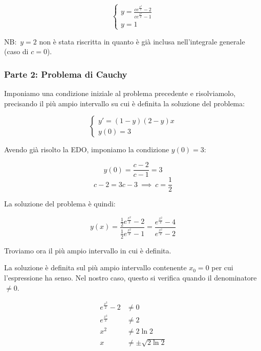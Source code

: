 \begin{equation*}
    \begin{cases}
        y = \frac{ce^{\frac{x ^{2}}{2} }-2}{ce^{\frac{x ^{2}}{2} }-1} \\
        y = 1
    \end{cases}
\end{equation*}

NB:\  \(y=2\) non è stata riscritta in quanto è già inclusa nell'integrale generale (caso di \(c = 0\)).

\filbreak{}
\subsubsection*{Parte 2: Problema di Cauchy}

Imponiamo una condizione iniziale al problema precedente e risolviamolo, precisando il più ampio intervallo su cui è definita la soluzione del problema:

\begin{equation*}
    \begin{cases}
        y'=(1-y)(2-y)x \\
        y(0)=3
    \end{cases}
\end{equation*}

Avendo già risolto la EDO, imponiamo la condizione \(y(0) = 3\):

\[
    y(0) = \frac{c-2}{c-1} = 3
\]
\[
    c-2 = 3c -3 \ \implies \ c = \frac{1}{2}
\]


La soluzione del problema è quindi:

\[
    y(x) = \frac{\frac{1}{2} e ^{\frac{x ^{2}}{2} }-2}{\frac{1}{2} e ^{\frac{x ^{2}}{2} }-1} = \frac{ e ^{\frac{x ^{2}}{2} }-4}{ e ^{\frac{x ^{2}}{2} }-2}
\]

Troviamo ora il più ampio intervallo in cui è definita.

La soluzione è definita sul più ampio intervallo contenente \(x_0 = 0\) per cui l'espressione ha senso. Nel nostro caso, questo si verifica quando il denominatore \(\neq 0\).

\begin{align*}
    e ^{\frac{x ^{2}}{2} } - 2 & \neq 0                 \\
    e ^{\frac{x ^{2}}{2} }     & \neq 2                 \\
    x ^{2}                     & \neq 2 \ln2            \\
    x                          & \neq \pm \sqrt{2 \ln2}
\end{align*}

